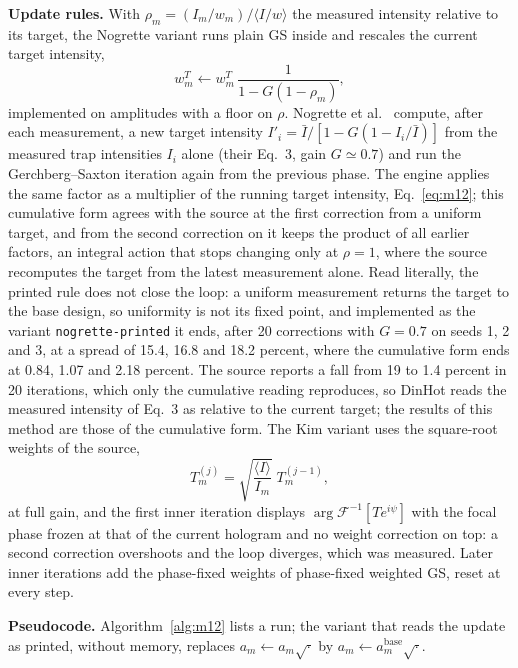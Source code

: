 \textbf{Update rules.} With $\rho_m=(I_m/w_m)/\langle I/w\rangle$ the measured intensity relative to its target, the Nogrette variant runs plain GS inside and rescales the current target intensity,
\begin{equation}
w_m^{T}\leftarrow w_m^{T}\,\frac{1}{1-G(1-\rho_m)},
\label{eq:m12}
\end{equation}
implemented on amplitudes with a floor on $\rho$. Nogrette et al.~\cite{nogrette} compute, after each measurement, a new target intensity $I'_i=\bar I/[1-G(1-I_i/\bar I)]$ from the measured trap intensities $I_i$ alone (their Eq.~3, gain $G\simeq0.7$) and run the Gerchberg--Saxton iteration again from the previous phase. The engine applies the same factor as a multiplier of the running target intensity, Eq.~\eqref{eq:m12}; this cumulative form agrees with the source at the first correction from a uniform target, and from the second correction on it keeps the product of all earlier factors, an integral action that stops changing only at $\rho=1$, where the source recomputes the target from the latest measurement alone. Read literally, the printed rule does not close the loop: a uniform measurement returns the target to the base design, so uniformity is not its fixed point, and implemented as the variant \texttt{nogrette-printed} it ends, after 20 corrections with $G=0.7$ on seeds 1, 2 and 3, at a spread of 15.4, 16.8 and 18.2 percent, where the cumulative form ends at 0.84, 1.07 and 2.18 percent. The source reports a fall from 19 to 1.4 percent in 20 iterations, which only the cumulative reading reproduces, so DinHot reads the measured intensity of Eq.~3 as relative to the current target; the results of this method are those of the cumulative form. The Kim variant uses the square-root weights of the source,
\begin{equation}
T^{(j)}_m=\sqrt{\frac{\langle I\rangle}{I_m}}\;T^{(j-1)}_m,
\label{eq:m12-kim}
\end{equation}
at full gain, and the first inner iteration displays $\arg\mathcal F^{-1}[Te^{i\psi}]$ with the focal phase frozen at that of the current hologram and no weight correction on top: a second correction overshoots and the loop diverges, which was measured. Later inner iterations add the phase-fixed weights of phase-fixed weighted GS, reset at every step.

\textbf{Pseudocode.} Algorithm~\ref{alg:m12} lists a run; the variant that reads the update as printed, without memory, replaces $a_m\gets a_m\sqrt{\cdot}$ by $a_m\gets a^{\mathrm{base}}_m\sqrt{\cdot}$.

